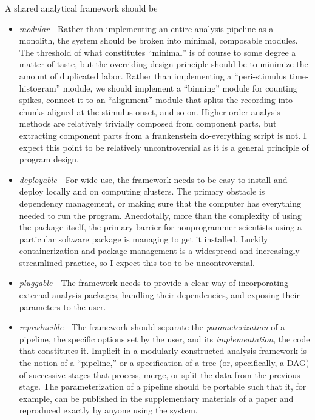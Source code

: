 \documentclass[nohyper]{tufte-book-jls}
\begin{document}
A shared analytical framework should be

\begin{itemize}

\item
  \emph{modular} - Rather than implementing an entire analysis pipeline
  as a monolith, the system should be broken into minimal, composable
  modules. The threshold of what constitutes ``minimal'' is of course to
  some degree a matter of taste, but the overriding design principle
  should be to minimize the amount of duplicated labor. Rather than
  implementing a ``peri-stimulus time-histogram'' module, we should
  implement a ``binning'' module for counting spikes, connect it to an
  ``alignment'' module that splits the recording into chunks aligned at
  the stimulus onset, and so on. Higher-order analysis methods are
  relatively trivially composed from component parts, but extracting
  component parts from a frankenstein do-everything script is not. I
  expect this point to be relatively uncontroversial as it is a general
  principle of program design.
\item
  \emph{deployable} - For wide use, the framework needs to be easy to
  install and deploy locally and on computing clusters. The primary
  obstacle is dependency management, or making sure that the computer
  has everything needed to run the program. Anecdotally, more than the
  complexity of using the package itself, the primary barrier for
  nonprogrammer scientists using a particular software package is
  managing to get it installed. Luckily containerization and package
  management is a widespread and increasingly streamlined practice, so I
  expect this too to be uncontroversial.
\item
  \emph{pluggable} - The framework needs to provide a clear way of
  incorporating external analysis packages, handling their dependencies,
  and exposing their parameters to the user.
\item
  \emph{reproducible} - The framework should separate the
  \emph{parameterization} of a pipeline, the specific options set by the
  user, and its \emph{implementation}, the code that constitutes it.
  Implicit in a modularly constructed analysis framework is the notion
  of a ``pipeline,'' or a specification of a tree (or, specifically, a
  \href{https://en.wikipedia.org/wiki/Directed_acyclic_graph}{DAG}) of
  successive stages that process, merge, or split the data from the
  previous stage. The parameterization of a pipeline should be portable
  such that it, for example, can be published in the supplementary
  materials of a paper and reproduced exactly by anyone using the
  system.
\end{itemize}
\end{document}
